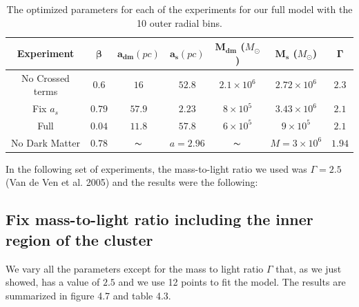 \begin{table}[H]
\begin{center}
\begin{tabular}{| c| c| c| c| c| c| c|}
    \hline
    \textbf{Experiment} & $\mathbf{\beta}$ & $\mathbf{a_{dm}} (pc)$ & $\mathbf{a_{s}} (pc)$ & $\mathbf{M_{dm}}$ ($M_{\odot}$) & $\mathbf{M_{s}}$ ($M_{\odot}$) & $\mathbf{\Gamma}$\\ \hline
	No Crossed terms & $0.6$ &	$16$ &	$52.8$ &	$2.1 \times 10^{6}$ &	$2.72 \times 10^{6}$ &	$2.3$\\ \hline
	Fix $a_s$ &	$0.79$ &	$57.9$ &	$2.23$ &	$8 \times 10^{5}$ &	$3.43 \times 10 ^{6}$ &	$2.1$\\ \hline
	Full &	$0.04$ &	$11.8$ &	$57.8$ &	$6 \times 10^{5}$ &	$9 \times 10^{5}$ &	$2.1$\\ \hline
	No Dark Matter &	$0.78$ &	$\thicksim$ & $ a = 2.96$ &	$\thicksim$ & $  M = 3 \times 10^{6}$ & 	$1.94$\\
    \hline
  \end{tabular} 
\caption[Optimized parameters for our full model with the 10 outer radial bins.]{The optimized parameters for each of the experiments for our full model with the 10 outer radial bins.}
\end{center}
  
\end{table}


In the following set of experiments, the mass-to-light ratio we used was $\Gamma = 2.5$ (Van de Ven et al. 2005) and the results were the following: 

\subsection{Fix mass-to-light ratio including the inner region of the cluster}


We vary all the parameters except for the mass to light ratio $\Gamma$ that, as we just showed, has a value of $2.5$ and we use 12 points to fit the model. The results are summarized in figure 4.7 and table 4.3.

